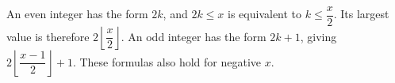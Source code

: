 An even integer has the form $2k$, and $2k\le x$ is equivalent to $k\le\dfrac{x}{2}$. Its largest value is therefore $\boxed{2\left\lfloor\dfrac{x}{2}\right\rfloor}$. An odd integer has the form $2k+1$, giving $\boxed{2\left\lfloor\dfrac{x-1}{2}\right\rfloor+1}$. These formulas also hold for negative $x$.
